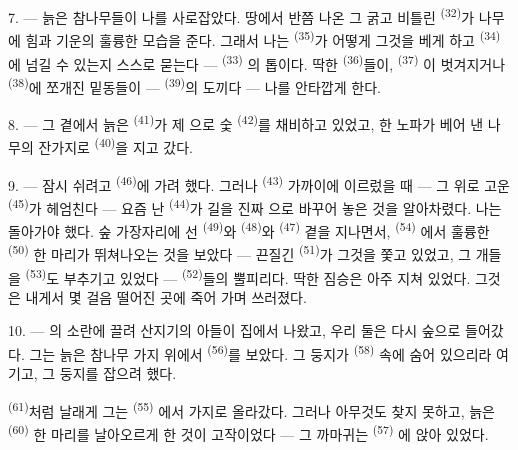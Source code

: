 \VUsaut{3.0mm}
\VUsaut{3.0mm}

7. --- 늙은 참나무들이 나를 사로잡았다. 땅에서 반쯤 나온 그 굵고 비틀린 
\textsuperscript{(32)}가 나무에 힘과 기운의 훌륭한 모습을 준다. 그래서 나는
 \textsuperscript{(35)}가 어떻게 그것을 베게 하고 
\textsuperscript{(34)}에 넘길 수 있는지 스스로 묻는다 —  \textsuperscript{(33)}
의 톱이다. 딱한  \textsuperscript{(36)}들이,  \textsuperscript{(37)}
이 벗겨지거나  \textsuperscript{(38)}에 쪼개진 밑동들이 — 
\textsuperscript{(39)}의 도끼다 — 나를 안타깝게 한다.

8. --- 그 곁에서 늙은  \textsuperscript{(41)}가 제 으로 숯
 \textsuperscript{(42)}를 채비하고 있었고, 한 노파가 베어 낸 나무의 잔가지로
  \textsuperscript{(40)}을 지고 갔다.

\VUsaut{3.0mm}
\VUsaut{3.0mm}

9. --- 잠시 쉬려고  \textsuperscript{(46)}에 가려 했다. 그러나
 \textsuperscript{(43)} 가까이에 이르렀을 때 — 그 위로 고운 
\textsuperscript{(45)}가 헤엄친다 — 요즘 난  \textsuperscript{(44)}가 길을
진짜 으로 바꾸어 놓은 것을 알아차렸다. 나는 돌아가야 했다. 숲 가장자리에 선
 \textsuperscript{(49)}와  \textsuperscript{(48)}와
 \textsuperscript{(47)} 곁을 지나면서,  \textsuperscript{(54)}
에서 훌륭한  \textsuperscript{(50)} 한 마리가 뛰쳐나오는 것을 보았다 —
끈질긴  \textsuperscript{(51)}가 그것을 쫓고 있었고, 그 개들을
 \textsuperscript{(53)}도 부추기고 있었다 — 
\textsuperscript{(52)}들의 뿔피리다. 딱한 짐승은 아주 지쳐 있었다. 그것은 내게서 몇
걸음 떨어진 곳에 죽어 가며 쓰러졌다.

10. --- 의 소란에 끌려 산지기의 아들이 집에서 나왔고, 우리 둘은 다시
숲으로 들어갔다. 그는 늙은 참나무 가지 위에서  \textsuperscript{(56)}를
보았다. 그 둥지가  \textsuperscript{(58)} 속에 숨어 있으리라 여기고, 그
둥지를 잡으려 했다.

 \textsuperscript{(61)}처럼 날래게 그는  \textsuperscript{(55)}
에서 가지로 올라갔다. 그러나 아무것도 찾지 못하고, 늙은  \textsuperscript{(60)}
한 마리를 날아오르게 한 것이 고작이었다 — 그 까마귀는  \textsuperscript{(57)}
에 앉아 있었다.

\VUsaut{6.0mm}
\VUfilet{22mm}
